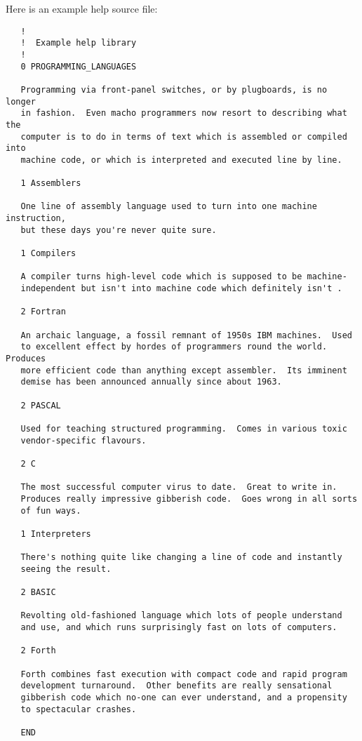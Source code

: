 Here is an example help source file:
\vspace{-1mm}
\begin{small}
\begin{verbatim}
   !
   !  Example help library
   !
   0 PROGRAMMING_LANGUAGES

   Programming via front-panel switches, or by plugboards, is no longer
   in fashion.  Even macho programmers now resort to describing what the
   computer is to do in terms of text which is assembled or compiled into
   machine code, or which is interpreted and executed line by line.

   1 Assemblers

   One line of assembly language used to turn into one machine instruction,
   but these days you're never quite sure.

   1 Compilers

   A compiler turns high-level code which is supposed to be machine-
   independent but isn't into machine code which definitely isn't .

   2 Fortran

   An archaic language, a fossil remnant of 1950s IBM machines.  Used
   to excellent effect by hordes of programmers round the world.  Produces
   more efficient code than anything except assembler.  Its imminent
   demise has been announced annually since about 1963.

   2 PASCAL

   Used for teaching structured programming.  Comes in various toxic
   vendor-specific flavours.

   2 C

   The most successful computer virus to date.  Great to write in.
   Produces really impressive gibberish code.  Goes wrong in all sorts
   of fun ways.

   1 Interpreters

   There's nothing quite like changing a line of code and instantly
   seeing the result.

   2 BASIC

   Revolting old-fashioned language which lots of people understand
   and use, and which runs surprisingly fast on lots of computers.

   2 Forth

   Forth combines fast execution with compact code and rapid program
   development turnaround.  Other benefits are really sensational
   gibberish code which no-one can ever understand, and a propensity
   to spectacular crashes.

   END
\end{verbatim}
\end{small}

